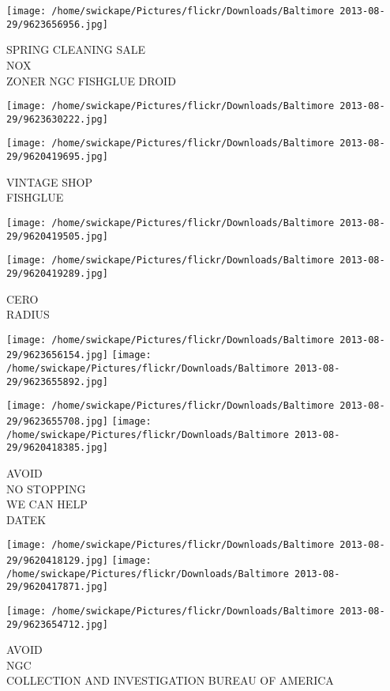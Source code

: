 \documentclass[10pt,letterpaper]{article}
\begin{document}
\vspace{0.25in}
\texttt{[image: /home/swickape/Pictures/flickr/Downloads/Baltimore 2013-08-29/9623656956.jpg]}

SPRING CLEANING SALE\\
NOX\\
ZONER NGC FISHGLUE DROID
\pagebreak

\texttt{[image: /home/swickape/Pictures/flickr/Downloads/Baltimore 2013-08-29/9623630222.jpg]}

\vspace{0.25in}
\texttt{[image: /home/swickape/Pictures/flickr/Downloads/Baltimore 2013-08-29/9620419695.jpg]}

VINTAGE SHOP\\
FISHGLUE
\pagebreak

\texttt{[image: /home/swickape/Pictures/flickr/Downloads/Baltimore 2013-08-29/9620419505.jpg]}

\vspace{0.25in}
\texttt{[image: /home/swickape/Pictures/flickr/Downloads/Baltimore 2013-08-29/9620419289.jpg]}

CERO\\
RADIUS
\pagebreak

\texttt{[image: /home/swickape/Pictures/flickr/Downloads/Baltimore 2013-08-29/9623656154.jpg]}
\texttt{[image: /home/swickape/Pictures/flickr/Downloads/Baltimore 2013-08-29/9623655892.jpg]}

\texttt{[image: /home/swickape/Pictures/flickr/Downloads/Baltimore 2013-08-29/9623655708.jpg]}
\texttt{[image: /home/swickape/Pictures/flickr/Downloads/Baltimore 2013-08-29/9620418385.jpg]}

AVOID\\
NO STOPPING\\
WE CAN HELP\\
DATEK
\pagebreak

\texttt{[image: /home/swickape/Pictures/flickr/Downloads/Baltimore 2013-08-29/9620418129.jpg]}
\texttt{[image: /home/swickape/Pictures/flickr/Downloads/Baltimore 2013-08-29/9620417871.jpg]}

\vspace{0.25in}
\texttt{[image: /home/swickape/Pictures/flickr/Downloads/Baltimore 2013-08-29/9623654712.jpg]}

AVOID\\
NGC\\
COLLECTION AND INVESTIGATION BUREAU OF AMERICA
\pagebreak
\end{document}
